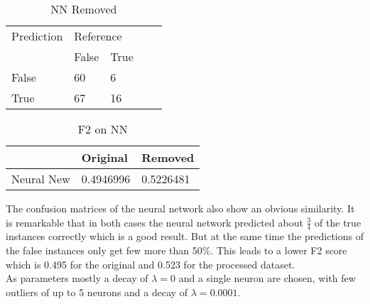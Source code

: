 \begin{table}[!htbp]
\centering
\caption{NN Removed}
\vspace{0.1cm}
\label{nn-remov}
\begin{tabular}{|l|ll|ll}
\cline{1-3}
Prediction & \multicolumn{2}{l|}{Reference} &  &  \\
           & False          & True          &  &  \\ \cline{2-3}
False      & 60              & 6             &  &  \\
True       & 67              & 16             &  &  \\ \cline{1-3}
\end{tabular}
\end{table}

\begin{table}[!htbp]
\centering
\caption{F2 on NN}
\vspace{0.1cm}
\label{nn-f2}
\begin{tabular}{|l|l|l|}
\hline
      & Original & Removed \\ \hline
Neural New & 0.4946996 & 0.5226481       \\ \hline
\end{tabular}
\end{table}



The confusion matrices of the neural network also show an obvious similarity. It is remarkable that in both cases the neural network predicted about \(\frac{3}{4}\) of the true instances correctly which is a good result. But at the same time the predictions of the false instances only get few more than 50\%. This leads to a lower F2 score which is 0.495 for the original and 0.523 for the processed dataset.\\
As parameters mostly a decay of \(\lambda = 0\) and a single neuron are chosen, with few outliers of up to 5 neurons and a decay of \(\lambda = 0.0001\).

